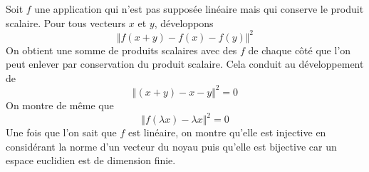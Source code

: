 Soit $f$ une application qui n'est pas supposée linéaire mais qui conserve le produit scalaire. Pour tous vecteurs $x$ et $y$, développons 
\begin{displaymath}
  \Vert f(x+y)-f(x)-f(y)\Vert^2
\end{displaymath}
On obtient une somme de produits scalaires avec des $f$ de chaque côté que l'on peut enlever par conservation du produit scalaire. Cela conduit au développement de
\begin{displaymath}
  \Vert (x+y) -x -y \Vert^2 = 0
\end{displaymath}
On montre de même que 
\begin{displaymath}
  \Vert f(\lambda x) - \lambda x\Vert^2 = 0
\end{displaymath}
Une fois que l'on sait que $f$ est linéaire, on montre qu'elle est injective en considérant la norme d'un vecteur du noyau puis qu'elle est bijective car un espace euclidien est de dimension finie.